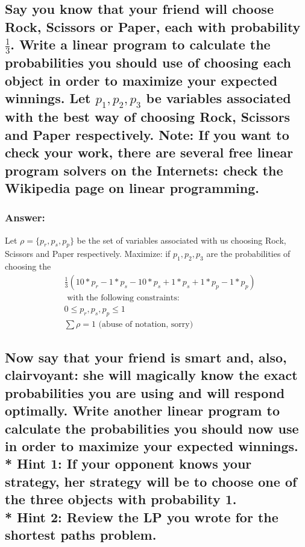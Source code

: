 \documentclass[titlepage]{article}\usepackage[]{graphicx}\usepackage[]{color}
\begin{document}
  \subsection{Say you know that your friend will choose Rock, Scissors or
        Paper, each with probability $\frac{1}{3}$. Write a linear program to
        calculate the probabilities you should use of choosing each object in
        order to maximize your expected winnings. Let $p_1,p_2,p_3$ be variables
        associated with the best way of choosing Rock, Scissors and Paper
        respectively. Note: If you want to check your work, there are several free
        linear program solvers on the Internets: check the Wikipedia page on linear
        programming.} 
  \subsubsection{Answer:}

  Let $\rho = \{p_{r}, p_{s}, p_{p}\}$ be the set of variables associated with us choosing Rock,
 Scissors and Paper respectively. Maximize: 
  if $p_1, p_2, p_3$ are the probabilities of choosing the 
  \begin{align}
    \label{rps:a}
    & \frac{1}{3}\left(10*p_{r} - 1*p_{s} - 10*p_{s} + 1*p_{s} +  1*p_{p} - 1*p_{p}\right) \\ 
    & \text{ with the following constraints:} \\ 
       & 0 \leq p_r, p_s, p_p \leq 1 \\ 
       & \sum \rho = 1  \text{  (abuse of notation, sorry)}
  \end{align}



  \subsection{Now say that your friend is smart and, also,
        clairvoyant: she will magically know the exact probabilities you are
        using and will respond optimally. Write another linear program to
        calculate the probabilities you should now use in order to maximize your
        expected winnings. \\* Hint 1: If your opponent knows your strategy, her
        strategy will be to choose one of the three objects with probability 1.
      \\* Hint 2: Review the LP you wrote for the shortest paths problem.}
\end{document}
